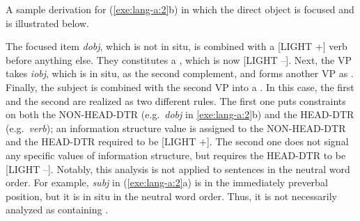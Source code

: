  \largerpage
{}



\noindent A sample derivation for (\ref{exe:lang-a:2}b) in which the
direct object is focused and  is illustrated below.




\noindent The focused item \textit{dobj}, which is not in
  situ, is combined with a [LIGHT +] verb before anything else. They
constitutes a , which is now [LIGHT --]. Next,
the VP takes \textit{iobj}, which is in situ, as the second
complement, and forms another VP as . Finally,
the subject is combined with the second VP into a
.  In this case, the first and the second
 are realized as two different rules. The first
one puts constraints on both the NON-HEAD-DTR (e.g.\ \textit{dobj} in
\ref{exe:lang-a:2}b) and the HEAD-DTR (e.g.\ \textit{verb}); an
information structure value  is assigned to the
NON-HEAD-DTR and the HEAD-DTR required to be [LIGHT +].
The second one does not signal any specific values of information
structure, but requires the HEAD-DTR to be [LIGHT --]. Notably, this
analysis is not applied to sentences in the neutral word order. For
example, \textit{subj} in (\ref{exe:lang-a:2}a) is in the immediately
preverbal position, but it is in situ in the neutral word
order. Thus, it is not necessarily analyzed as containing
.





